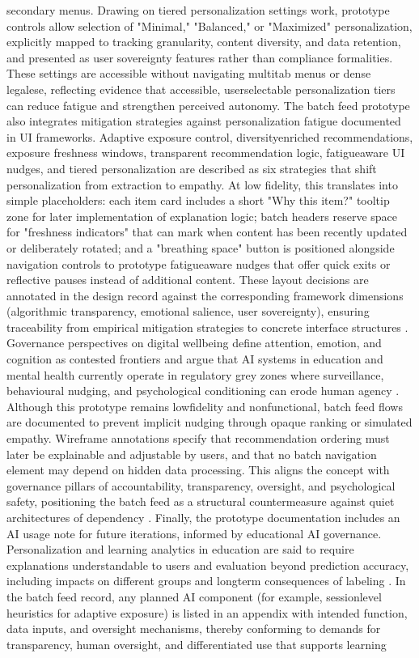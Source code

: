 \documentclass{article}
\begin{document}
secondary menus. Drawing on tiered personalization settings work, prototype controls allow selection of "Minimal," "Balanced," or "Maximized" personalization, explicitly mapped to tracking granularity, content diversity, and data retention, and presented as user sovereignty features rather than compliance formalities. These settings are accessible without navigating multi\-tab menus or dense legalese, reflecting evidence that accessible, user\-selectable personalization tiers can reduce fatigue and strengthen perceived autonomy. The batch feed prototype also integrates mitigation strategies against personalization fatigue documented in UI frameworks. Adaptive exposure control, diversity\-enriched recommendations, exposure freshness windows, transparent recommendation logic, fatigue\-aware UI nudges, and tiered personalization are described as six strategies that shift personalization from extraction to empathy. At low fidelity, this translates into simple placeholders: each item card includes a short "Why this item?" tooltip zone for later implementation of explanation logic; batch headers reserve space for "freshness indicators" that can mark when content has been recently updated or deliberately rotated; and a "breathing space" button is positioned alongside navigation controls to prototype fatigue\-aware nudges that offer quick exits or reflective pauses instead of additional content. These layout decisions are annotated in the design record against the corresponding framework dimensions (algorithmic transparency, emotional salience, user sovereignty), ensuring traceability from empirical mitigation strategies to concrete interface structures \parencites[6]{0270098}. Governance perspectives on digital well\-being define attention, emotion, and cognition as contested frontiers and argue that AI systems in education and mental health currently operate in regulatory grey zones where surveillance, behavioural nudging, and psychological conditioning can erode human agency \parencites[3]{7808872}. Although this prototype remains low\-fidelity and non\-functional, batch feed flows are documented to prevent implicit nudging through opaque ranking or simulated empathy. Wireframe annotations specify that recommendation ordering must later be explainable and adjustable by users, and that no batch navigation element may depend on hidden data processing. This aligns the concept with governance pillars of accountability, transparency, oversight, and psychological safety, positioning the batch feed as a structural countermeasure against quiet architectures of dependency \parencites[3]{7808872}[8]{7808872}. Finally, the prototype documentation includes an AI usage note for future iterations, informed by educational AI governance. Personalization and learning analytics in education are said to require explanations understandable to users and evaluation beyond prediction accuracy, including impacts on different groups and long\-term consequences of labeling \parencites[6]{5375614}. In the batch feed record, any planned AI component (for example, session\-level heuristics for adaptive exposure) is listed in an appendix with intended function, data inputs, and oversight mechanisms, thereby conforming to demands for transparency, human oversight, and differentiated use that supports learning 
\end{document}

